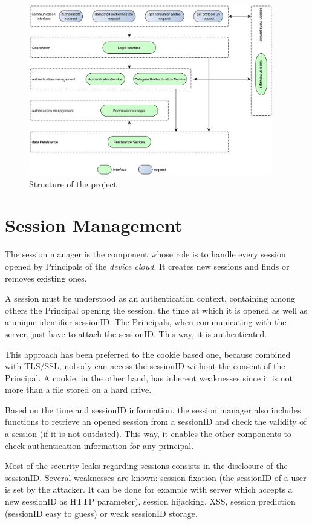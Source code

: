 \begin{figure}[hpbt]
	\centering
	\caption{Structure of the project}
	\label{fig:code_struct}
	\includegraphics[angle=90,width=0.95\textwidth]{images/code_struct}
\end{figure}

\section{Session Management}
The session manager is the component whose role is to handle every session opened by Principals of the \emph{device cloud}. It creates new sessions and finds or removes existing ones. 

A session must be understood as an authentication context, containing among others the Principal opening the session, the time at which it is opened as well as a unique identifier sessionID. The Principals, when communicating with the server, just have to attach the sessionID. This way, it is authenticated. 

This approach has been preferred to the cookie based one, because combined with TLS/SSL, nobody can access the sessionID without the consent of the Principal. A cookie, in the other hand, has inherent weaknesses since it is not more than a file stored on a hard drive.

Based on the time and sessionID information, the session manager also includes functions to retrieve an opened session from a sessionID and check the validity of a session (if it is not outdated). This way, it enables the other components to check authentication information for any principal.

Most of the security leaks regarding sessions consists in the disclosure of the sessionID. Several weaknesses are known: session fixation (the sessionID of a user is set by the attacker. It can be done for example with server which accepts a new sessionID as HTTP parameter), session hijacking, XSS, session prediction (sessionID easy to guess) or weak sessionID storage.

